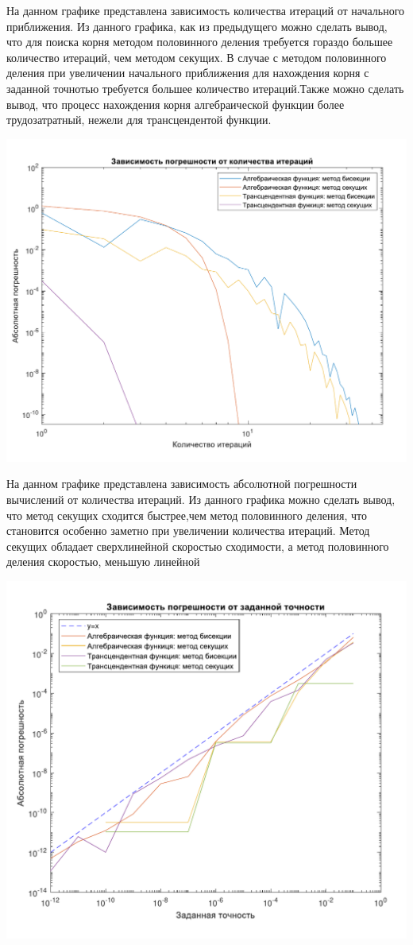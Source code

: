 На данном графике представлена зависимость количества итераций от начального приближения. Из данного графика, как из предыдущего можно сделать вывод, что для поиска корня методом половинного деления требуется гораздо большее количество итераций, чем методом секущих. В случае с методом половинного деления при увеличении начального приближения для нахождения корня с заданной точнотью требуется большее количество итераций.Также можно сделать вывод, что процесс нахождения корня алгебраической функции более трудозатратный, нежели для трансцендентой функции.

\includegraphics[scale=0.75]{7.pdf}

На данном графике представлена зависимость абсолютной погрешности вычислений от количества итераций. Из данного графика можно сделать вывод, что метод секущих сходится быстрее,чем метод половинного деления, что становится особенно заметно при увеличении количества итераций. Метод секущих обладает сверхлинейной скоростью сходимости, а метод половинного деления скоростью, меньшую линейной

\includegraphics[scale=0.75]{8.pdf}

